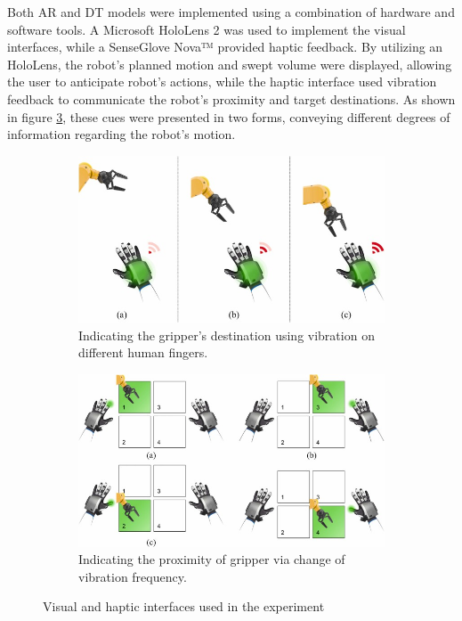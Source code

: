\begin{enumerate}

    Both \ac{AR} and \ac{DT} models were implemented using a combination of hardware and software tools. A Microsoft HoloLens 2 was used to implement the visual interfaces, while a SenseGlove Nova™ provided haptic feedback. By utilizing an HoloLens, the robot's planned motion and swept volume were displayed, allowing the user to anticipate robot's actions, while the haptic interface used vibration feedback to communicate the robot's proximity and target destinations. As shown in figure \ref{fig:haptic-visual-cues}, these cues were presented in two forms, conveying different degrees of information regarding the robot’s motion.

    \begin{figure}[htp]
        \centering
        \begin{subfigure}{.49\textwidth}
            \centering
            \includegraphics[width=0.9\linewidth]{figs/haptic-cues.jpg}
            \caption{Indicating the gripper’s destination using vibration on different human fingers.}
            \label{fig:sfig1}
        \end{subfigure}%
        \begin{subfigure}{.49\textwidth}
            \centering
            \includegraphics[width=0.9\linewidth]{figs/visual-cues.jpg}
            \caption{Indicating the proximity of gripper via change of vibration frequency.}
            \label{fig:sfig2}
        \end{subfigure}
        \caption{Visual and haptic interfaces used in the experiment \cite{CHU2023313}}
        \label{fig:haptic-visual-cues}
    \end{figure}


\end{enumerate}
